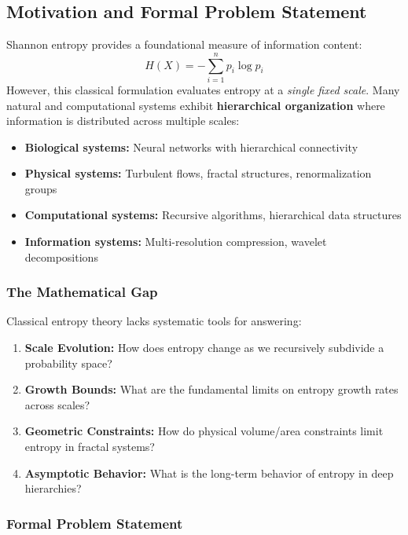 \documentclass[11pt,a4paper]{article}
\theoremstyle{definition}
\theoremstyle{remark}
\begin{document}
\subsection{Motivation and Formal Problem Statement}
\label{subsec:motivation}

Shannon entropy \cite{shannon1948} provides a foundational measure of information content:
\begin{equation}
    H(X) = -\sum_{i=1}^{n} p_i \log p_i
    \label{eq:shannon}
\end{equation}
However, this classical formulation evaluates entropy at a \emph{single fixed scale}. Many natural and computational systems exhibit \textbf{hierarchical organization} where information is distributed across multiple scales:

\begin{itemize}[nosep]
    \item \textbf{Biological systems:} Neural networks with hierarchical connectivity
    \item \textbf{Physical systems:} Turbulent flows, fractal structures, renormalization groups
    \item \textbf{Computational systems:} Recursive algorithms, hierarchical data structures
    \item \textbf{Information systems:} Multi-resolution compression, wavelet decompositions
\end{itemize}

\subsubsection{The Mathematical Gap}

Classical entropy theory lacks systematic tools for answering:

\begin{enumerate}
    \item \textbf{Scale Evolution:} How does entropy change as we recursively subdivide a probability space?
    \item \textbf{Growth Bounds:} What are the fundamental limits on entropy growth rates across scales?
    \item \textbf{Geometric Constraints:} How do physical volume/area constraints limit entropy in fractal systems?
    \item \textbf{Asymptotic Behavior:} What is the long-term behavior of entropy in deep hierarchies?
\end{enumerate}

\subsubsection{Formal Problem Statement}
\end{document}
